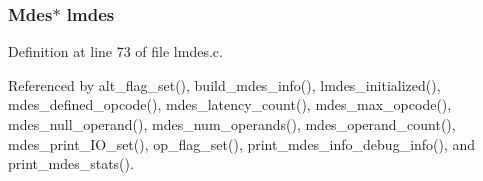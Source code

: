 \subsubsection{\setlength{\rightskip}{0pt plus 5cm}\bf{Mdes}$\ast$ \bf{lmdes}}\label{lmdes_8h_fccb3150d93023d97c16ad96e4db32dd}




Definition at line 73 of file lmdes.c.

Referenced by alt\_\-flag\_\-set(), build\_\-mdes\_\-info(), lmdes\_\-initialized(), mdes\_\-defined\_\-opcode(), mdes\_\-latency\_\-count(), mdes\_\-max\_\-opcode(), mdes\_\-null\_\-operand(), mdes\_\-num\_\-operands(), mdes\_\-operand\_\-count(), mdes\_\-print\_\-IO\_\-set(), op\_\-flag\_\-set(), print\_\-mdes\_\-info\_\-debug\_\-info(), and print\_\-mdes\_\-stats().
